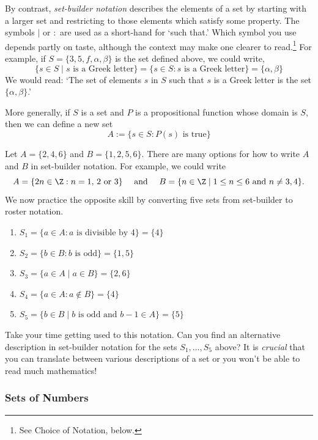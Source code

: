 By contrast, \emph{set-builder notation} describes the elements of a set by starting with a larger set and restricting to those elements which satisfy some property. The symbols $\mid$ or $:$ are used as a short-hand for `such that.' Which symbol you use depends partly on taste, although the context may make one clearer to read.\footnote{See Choice of Notation, below.} For example, if $S=\{3,5,f,\alpha,\beta\}$ is the set defined above, we could write,
\[\{s\in S\mid s\text{ is a Greek letter}\}=\{s\in S:s\text{ is a Greek letter}\}=\{\alpha,\beta\}\]
We would read: `The set of elements $s$ in $S$ such that $s$ is a Greek letter is the set $\{\alpha,\beta\}$.'\pagebreak

\noindent More generally, if $S$ is a set and $P$ is a propositional function whose domain is $S$, then we can define a new set
\[A:=\{s\in S:P(s)\text{ is true}\}\]

\begin{example}
Let $A=\{2,4,6\}$ and $B=\{1,2,5,6\}$. There are many options for how to write $A$ and $B$ in set-builder notation. For example, we could write
\[A=\{2n\in\Z:n=1,\,2\text{ or }3\}\quad\text{ and }\quad B=\{n\in\Z\mid 1\le n\le 6\text{ and }n\neq 3,4\}.\]
We now practice the opposite skill by converting five sets from set-builder to roster notation.
\begin{enumerate}
  \item[] $S_1=\{a\in A:a\text{ is divisible by 4}\}=\{4\}$
  \item[] $S_2=\{b\in B:b\text{ is odd}\}=\{1,5\}$
  \item[] $S_3=\{a\in A\mid a\in B\}=\{2,6\}$
  \item[] $S_4=\{a\in A:a\not\in B\}=\{4\}$
  \item[] $S_5=\{b\in B\mid b\text{ is odd and $b-1\in A$}\}=\{5\}$
\end{enumerate}
\end{example}

\noindent Take your time getting used to this notation. Can you find an alternative description in set-builder notation for the sets $S_1,\ldots,S_5$ above? It is \emph{crucial} that you can translate between various descriptions of a set or you won't be able to read much mathematics!


\subsubsection*{Sets of Numbers}


